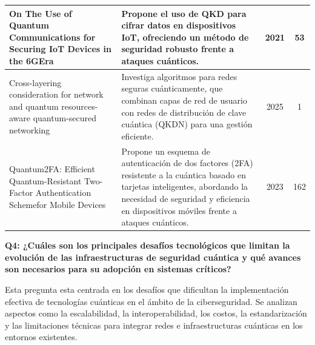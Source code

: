 \begin{longtable}{@{} p{4.5cm} p{6.5cm} c c @{}}
\hline
On The Use of Quantum Communications for Securing IoT Devices in the 6GEra~\cite{AlMohammed2021} & Propone el uso de QKD para cifrar datos en dispositivos IoT, ofreciendo un método de seguridad robusto frente a ataques cuánticos. & 2021 & 53 \\
\hline
Cross-layering consideration for network and quantum resources-aware quantum-secured networking~\cite{LEE2025} & Investiga algoritmos para redes seguras cuánticamente, que combinan capas de red de usuario con redes de distribución de clave cuántica (QKDN) para una gestión eficiente. & 2025 & 1 \\
\hline
Quantum2FA: Efficient Quantum-Resistant Two-Factor Authentication Schemefor Mobile Devices~\cite{Wang2023} & Propone un esquema de autenticación de dos factores (2FA) resistente a la cuántica basado en tarjetas inteligentes, abordando la necesidad de seguridad y eficiencia en dispositivos móviles frente a ataques cuánticos. & 2023 & 162 \\
\end{longtable}

\vspace{1em} \textbf {Q4: ¿Cuáles son los principales desafíos tecnológicos que limitan la evolución de las infraestructuras de seguridad cuántica y qué avances son necesarios para su adopción en sistemas críticos?}

Esta pregunta esta centrada en los desafíos que dificultan la implementación efectiva de tecnologías cuánticas en el ámbito de la ciberseguridad. Se analizan aspectos como la escalabilidad, la interoperabilidad, los costos, la estandarización y las limitaciones técnicas para integrar redes e infraestructuras cuánticas en los entornos existentes.


